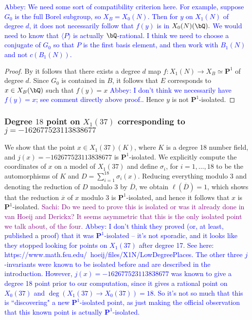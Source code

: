 \documentclass[11pt,reqno]{amsart}
\theoremstyle{plain}
\theoremstyle{definition}
\newcommand{\Q}{\bQ}
\newcommand{\PP}{\mathbf P}
\newcommand{\filip}[1]{{\textcolor{cyan}{Filip: [#1]}}}
\newcommand{\abbey}[1]{\textcolor{blue}{Abbey: #1}}
\newcommand{\sachi}[1]{\textcolor{purple}{Sachi: #1}}
\begin{document}
\abbey{We need some sort of compatibility criterion here. For example, suppose $G_0$ is the full Borel subgroup, so $X_B=X_0(N)$. Then for $y$ on $X_1(N)$ of degree $d$, it does not necessarily follow that $f(y)$ is in $X_0(N)(\Q).$ We would need to know that $\langle P \rangle$ is actually $\Q$-rational. I think we need to choose a conjugate of $G_0$ so that $P$ is the first basis element, and then work with $B_1(N)$ and not $c(B_1(N))$.}

\begin{proof}
    By  it follows that there exists a degree $d$ map $f\colon X_1(N)\rightarrow X_B\simeq \PP^1$ of degree $d$. Since $G_0$ is contained in $B$, it follows that $E$ corresponds to  $x\in X_B(\Q)$ such that $f(y)=x$ \abbey{I don't think we necessarily have $f(y)=x$; see comment directly above proof.}. Hence $y$ is not $\PP^1$-isolated.
\end{proof}

\fi


\subsubsection{Degree $18$ point on $X_1(37)$ corresponding to $j=-162677523113838677$}

We show that the point $x\in X_1(37)(K)$, where $K$ is a degree 18 number field, and $j(x)=-162677523113838677$ is $\PP^1$-isolated. We explicitly compute the coordinates of $x$ on a model of $X_1(37)$ and define  $\sigma_i$, for $i=1,\ldots, 18$ to be the automorphisms of $K$ and $D=\sum_{i=1}^{18}\sigma_i(x)$. Reducing everything modulo $3$ and denoting the reduction of $D$ modulo $3$ by $\overline{D}$, we obtain $\ell(\overline{D})=1$, which shows that the reduction 
$\overline{x}$ of $x$ modulo 3 is $\PP^1$-isolated, and hence it follows that $x$ is $\PP^1$-isolated.  %
\sachi{Do we need to prove this is isolated or was it already done in van Hoeij and Derickx? It seems asymmetric that this is the only isolated point we talk about, of the four.} \abbey{I don't think they proved (or, at least, published a proof) that it was $\PP^1$-isolated -- it's not sporadic, and it looks like they stopped looking for points on $X_1(37)$ after degree 17. See here: https://www.math.fsu.edu/~hoeij/files/X1N/LowDegreePlaces. The other three $j$-invariants were known to be isolated before and are described in the introduction. However, $j(x)=-162677523113838677$ was known to give a degree 18 point prior to our computation, since it gives a rational point on $X_0(37)$ and $\deg(X_1(37) \rightarrow X_0(37))=18$. So it's not so much that this is ``discovering" a new $\PP^1$-isolated point, as just making the official observation that this known point is actually $\PP^1$-isolated.}
\end{document}
